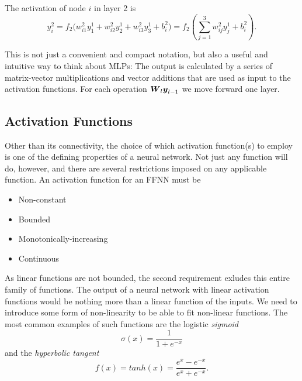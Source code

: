 The activation of node $i$ in layer 2 is
\begin{equation}
 y^2_i = f_2\Bigr(w^2_{i1}y^1_1 + w^2_{i2}y^1_2 + w^2_{i3}y^1_3 + b^2_i\Bigr) = 
 f_2\left(\sum_{j=1}^3 w^2_{ij} y_j^1 + b^2_i\right).
\end{equation}

This is not just a convenient and compact notation, but also a useful
and intuitive way to think about MLPs: The output is calculated by a
series of matrix-vector multiplications and vector additions that are
used as input to the activation functions. For each operation
${\boldsymbol{W}}_l {\boldsymbol{y}}_{l-1}$ we move forward one layer.

\subsection{Activation Functions}
Other than its connectivity, the choice of which activation function(s) to employ 
is one of the defining properties of a neural network. Not just any function will do,
however, and there are several restrictions imposed on any applicable function.
An activation function for an FFNN must be
\begin{itemize}
	\item Non-constant
	\item Bounded
	\item Monotonically-increasing
	\item Continuous
\end{itemize}

\noindent As linear functions are not bounded, the second requirement exludes this entire family of functions.
The output of a neural network with linear activation functions would be nothing more than a linear function
of the inputs. We need to introduce some form of non-linearity to be able to fit non-linear functions.
The most common examples of such functions are the logistic \textit{sigmoid}
\begin{equation}\label{eq:sigmoid}
	\sigma(x) = \frac{1}{1+e^{-x}}
\end{equation}
and the \textit{hyperbolic tangent}
\begin{equation}\label{eq:hyp-tangent}
	f(x) = tanh(x) = \frac{e^x - e^{-x}}{e^x + e^{-x}}.
\end{equation}

